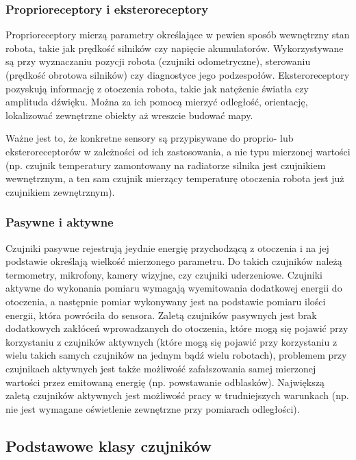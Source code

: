 \subsubsection{Proprioreceptory i eksteroreceptory}

Proprioreceptory mierzą parametry określające w pewien sposób wewnętrzny stan
robota, takie jak prędkość silników czy napięcie akumulatorów. Wykorzystywane są
przy wyznaczaniu pozycji robota (czujniki odometryczne), sterowaniu (prędkość
obrotowa silników) czy diagnostyce jego podzespołów. Eksteroreceptory 
pozyskują informację z otoczenia robota, takie jak natężenie
światła czy amplituda dźwięku. Można za ich pomocą mierzyć odległość,
orientację, lokalizować zewnętrzne obiekty aż wreszcie budować mapy.

Ważne jest to, że konkretne sensory są przypisywane do proprio- lub
eksteroreceptorów w zależności od ich zastosowania, a nie typu mierzonej
wartości (np. czujnik temperatury zamontowany na radiatorze silnika jest
czujnikiem wewnętrznym, a ten sam czujnik mierzący temperaturę otoczenia robota
jest już czujnikiem zewnętrznym).

\subsubsection{Pasywne i aktywne}

Czujniki pasywne rejestrują jeydnie energię przychodzącą z otoczenia i na
jej podstawie określają wielkość mierzonego parametru. Do takich czujników 
należą termometry, mikrofony, kamery wizyjne, czy czujniki uderzeniowe.
Czujniki aktywne do wykonania pomiaru wymagają wyemitowania dodatkowej energii
do otoczenia, a następnie pomiar wykonywany jest na podstawie pomiaru ilości
energii, która powróciła do sensora. Zaletą czujników pasywnych jest brak
dodatkowych zakłóceń wprowadzanych do otoczenia, które mogą się pojawić 
przy korzystaniu z czujników aktywnych (które mogą się pojawić przy korzystaniu
z wielu takich samych czujników na jednym bądź wielu robotach), problemem 
przy czujnikach aktywnych jest także możliwość zafałszowania samej mierzonej
wartości przez emitowaną energię (np. powstawanie odblasków). Największą zaletą
czujników aktywnych jest możliwość pracy w trudniejszych warunkach (np. nie
jest wymagane oświetlenie zewnętrzne przy pomiarach odległości).

\subsection{Podstawowe klasy czujników}

